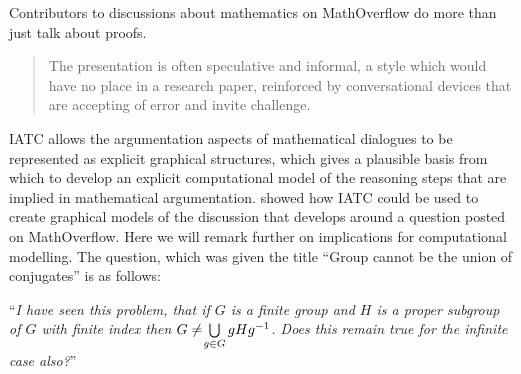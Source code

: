\documentclass[smallextended,oneside]{svjour3}       %
\let\cite\citep
\newcommand\nothing[1]{#1}
\let\paragraph\nothing
\begin{document}
Contributors to discussions about mathematics on MathOverflow do more than just talk about proofs.
\begin{quote}
The presentation is often speculative and informal, a style which
would have no place in a research paper, reinforced by conversational
devices that are accepting of error and invite
challenge. \cite{martin2013does}
\end{quote}


\paragraph{IATC allows the argumentation aspects of mathematical dialogues to be represented as explicit graphical structures, which gives a plausible basis from which to develop an explicit computational model of the reasoning steps that are implied in mathematical argumentation.}
\paragraph{\citet{corneli2017towards} showed how IATC could be used to create graphical models of the discussion that develops around a question posted on MathOverflow.}  Here we will remark further on implications for computational modelling.
The question, which was given the title  ``Group cannot be the union of conjugates'' \cite{chandrasekhar2010group} is as follows:

\medskip

\noindent ``\emph{I have seen this problem, that if $G$ is a finite group and $H$ is a
  proper subgroup of $G$ with finite index then $ G \neq\hspace{-.2em}\bigcup\limits_{g \in G} gHg^{-1}$. Does this remain true for the
  infinite case also?}''
\end{document}
